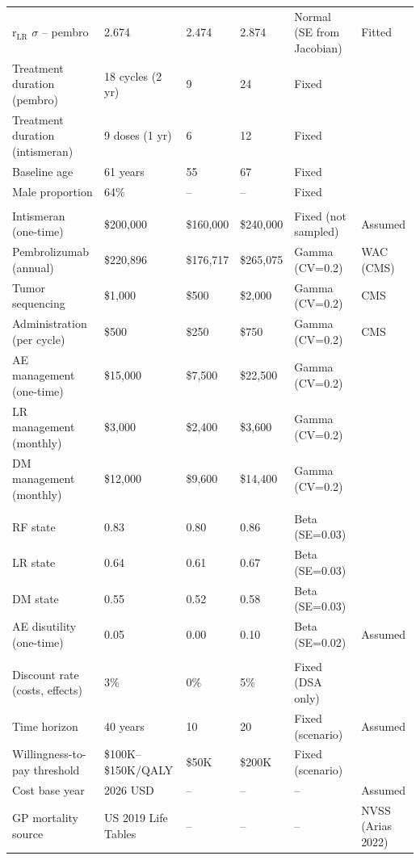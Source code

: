 \documentclass[11pt,a4paper]{article}
\begin{document}
\begin{landscape}
\begin{table}[p]
\begin{tabularx}{\linewidth}{@{}>{\raggedright\arraybackslash}Xlll>{\raggedright\arraybackslash}Xl@{}}
r$_{\text{LR}}$ $\sigma$ -- pembro & 2.674 & 2.474 & 2.874 & Normal (SE from Jacobian) & Fitted \\
Treatment duration (pembro) & 18 cycles (2 yr) & 9 & 24 & Fixed & \cite{khattak2026} \\
Treatment duration (intismeran) & 9 doses (1 yr) & 6 & 12 & Fixed & \cite{khattak2026} \\
Baseline age & 61 years & 55 & 67 & Fixed & \cite{khattak2026} \\
Male proportion & 64\% & -- & -- & Fixed & \cite{khattak2026} \\
\midrule
\multicolumn{6}{c}{\textit{Costs (2026 USD)}} \\
Intismeran (one-time) & \$200,000 & \$160,000 & \$240,000 & Fixed (not sampled) & Assumed \\
Pembrolizumab (annual) & \$220,896 & \$176,717 & \$265,075 & Gamma (CV=0.2) & WAC (CMS) \\
Tumor sequencing & \$1,000 & \$500 & \$2,000 & Gamma (CV=0.2) & CMS \\
Administration (per cycle) & \$500 & \$250 & \$750 & Gamma (CV=0.2) & CMS \\
AE management (one-time) & \$15,000 & \$7,500 & \$22,500 & Gamma (CV=0.2) & \cite{zhang2023} \\
LR management (monthly) & \$3,000 & \$2,400 & \$3,600 & Gamma (CV=0.2) & \cite{zhang2023} \\
DM management (monthly) & \$12,000 & \$9,600 & \$14,400 & Gamma (CV=0.2) & \cite{bensimon2019} \\
\midrule
\multicolumn{6}{c}{\textit{Utilities}} \\
RF state & 0.83 & 0.80 & 0.86 & Beta (SE=0.03) & \cite{johnston2021} \\
LR state & 0.64 & 0.61 & 0.67 & Beta (SE=0.03) & \cite{johnston2021} \\
DM state & 0.55 & 0.52 & 0.58 & Beta (SE=0.03) & \cite{johnston2021} \\
AE disutility (one-time) & 0.05 & 0.00 & 0.10 & Beta (SE=0.02) & Assumed \\
\midrule
\multicolumn{6}{c}{\textit{Economic Parameters}} \\
Discount rate (costs, effects) & 3\% & 0\% & 5\% & Fixed (DSA only) & \cite{sanders2016} \\
Time horizon & 40 years & 10 & 20 & Fixed (scenario) & Assumed \\
Willingness-to-pay threshold & \$100K--\$150K/QALY & \$50K & \$200K & Fixed (scenario) & \cite{neumann2014} \\
Cost base year & 2026 USD & -- & -- & -- & Assumed \\
GP mortality source & US 2019 Life Tables & -- & -- & -- & NVSS (Arias 2022) \\
\bottomrule
\end{tabularx}
\end{table}
\end{landscape}
\end{document}
